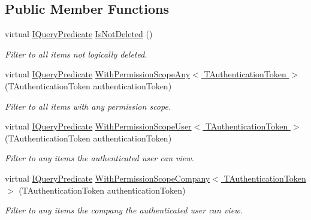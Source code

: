 \subsection*{Public Member Functions}
\begin{DoxyCompactItemize}
\item 
virtual \hyperlink{interfaceCqrs_1_1Repositories_1_1Queries_1_1IQueryPredicate}{I\+Query\+Predicate} \hyperlink{classCqrs_1_1Repositories_1_1Queries_1_1QueryStrategy_aa872cafb9c17c9ea9d933be2ba209a6b_aa872cafb9c17c9ea9d933be2ba209a6b}{Is\+Not\+Deleted} ()
\begin{DoxyCompactList}\small\item\em Filter to all items not logically deleted. \end{DoxyCompactList}\item 
virtual \hyperlink{interfaceCqrs_1_1Repositories_1_1Queries_1_1IQueryPredicate}{I\+Query\+Predicate} \hyperlink{classCqrs_1_1Repositories_1_1Queries_1_1QueryStrategy_a7fda4380a88972201258bf695ccaf287_a7fda4380a88972201258bf695ccaf287}{With\+Permission\+Scope\+Any$<$ T\+Authentication\+Token $>$} (T\+Authentication\+Token authentication\+Token)
\begin{DoxyCompactList}\small\item\em Filter to all items with any permission scope. \end{DoxyCompactList}\item 
virtual \hyperlink{interfaceCqrs_1_1Repositories_1_1Queries_1_1IQueryPredicate}{I\+Query\+Predicate} \hyperlink{classCqrs_1_1Repositories_1_1Queries_1_1QueryStrategy_ad8b52782f5410a399949417b10820780_ad8b52782f5410a399949417b10820780}{With\+Permission\+Scope\+User$<$ T\+Authentication\+Token $>$} (T\+Authentication\+Token authentication\+Token)
\begin{DoxyCompactList}\small\item\em Filter to any items the authenticated user can view. \end{DoxyCompactList}\item 
virtual \hyperlink{interfaceCqrs_1_1Repositories_1_1Queries_1_1IQueryPredicate}{I\+Query\+Predicate} \hyperlink{classCqrs_1_1Repositories_1_1Queries_1_1QueryStrategy_a822a0901976ceadb3f096326860e3006_a822a0901976ceadb3f096326860e3006}{With\+Permission\+Scope\+Company$<$ T\+Authentication\+Token $>$} (T\+Authentication\+Token authentication\+Token)
\begin{DoxyCompactList}\small\item\em Filter to any items the company the authenticated user can view. \end{DoxyCompactList}\item 

\end{DoxyCompactItemize}

